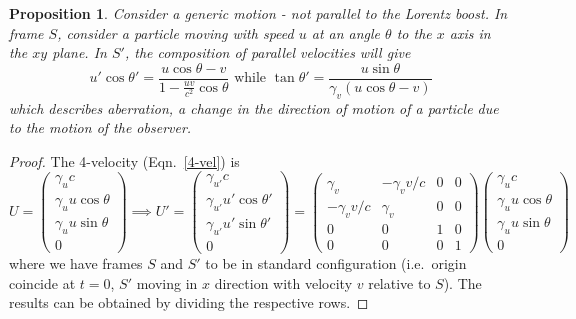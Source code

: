 \documentclass[a4paper]{article}
\theoremstyle{new}
\newtheorem{prop}{Proposition}[section]
\begin{document}
\begin{prop}
Consider a generic motion - not parallel to the Lorentz boost. In frame $S$, consider a particle moving with speed $u$ at an angle $\theta$ to the $x$ axis in the $xy$ plane. In $S'$, the composition of parallel velocities will give
\begin{equation}
u'\cos \theta' = \frac{u\cos \theta - v}{1 - \frac{uv}{c^2}\cos \theta}\text{ while }
  \tan \theta' = \frac{u\sin \theta}{\gamma_v(u\cos \theta - v)}\label{velboost}
\end{equation}
which describes aberration, a change in the direction of motion of a particle due to the motion of the observer. 
\end{prop}
\begin{proof}
The 4-velocity (Eqn.~\ref{4-vel}) is
$$U =
  \begin{pmatrix}
    \gamma_u c\\
    \gamma_u u\cos \theta\\
    \gamma_u u\sin \theta\\
    0
  \end{pmatrix}\implies  U' = \begin{pmatrix}
    \gamma_{u'} c\\
    \gamma_{u'} u'\cos \theta'\\
    \gamma_{u'} u'\sin \theta'\\
    0
  \end{pmatrix}
  =
  \begin{pmatrix}
    \gamma_v & -\gamma_v v/c & 0 & 0\\
    -\gamma_{v} v/c & \gamma_v & 0 & 0\\
    0 & 0 & 1 & 0\\
    0 & 0 & 0 & 1
  \end{pmatrix}
  \begin{pmatrix}
    \gamma_u c\\
    \gamma_u u\cos \theta\\
    \gamma_u u\sin \theta\\
    0
  \end{pmatrix}$$
where we have frames $S$ and $S'$ to be in standard configuration (i.e.\ origin coincide at $t = 0$, $S'$ moving in $x$ direction with velocity $v$ relative to $S$). The results can be obtained by dividing the respective rows.
\end{proof}
\end{document}
